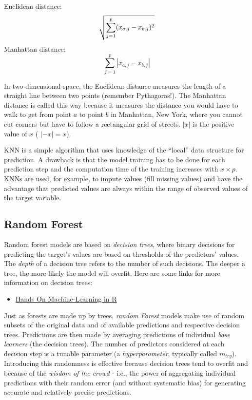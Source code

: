 \documentclass[
]{book}
\providecommand{\tightlist}{%
  \setlength{\itemsep}{0pt}\setlength{\parskip}{0pt}}
\begin{document}
Euclidean distance:
\[
\sqrt{ \sum_{j=1}^p (x_{a,j} - x_{b,j})^2  } \\
\]
Manhattan distance:
\[
\sum_{j=1}^p | x_{a,j} - x_{b,j} |
\]

In two-dimensional space, the Euclidean distance measures the length of a straight line between two points (remember Pythagoras!). The Manhattan distance is called this way because it measures the distance you would have to walk to get from point \(a\) to point \(b\) in Manhattan, New York, where you cannot cut corners but have to follow a rectangular grid of streets. \(|x|\) is the positive value of \(x\) ( \(|-x| = x\)).

KNN is a simple algorithm that uses knowledge of the ``local'' data structure for prediction. A drawback is that the model training has to be done for each prediction step and the computation time of the training increases with \(x \times p\). KNNs are used, for example, to impute values (fill missing values) and have the advantage that predicted values are always within the range of observed values of the target variable.

\hypertarget{random-forest}{%
\subsection{Random Forest}\label{random-forest}}

Random forest models are based on \emph{decision trees}, where binary decisions for predicting the target's values are based on thresholds of the predictors' values. The \emph{depth} of a decision tree refers to the number of such decisions. The deeper a tree, the more likely the model will overfit. Here are some links for more information on decision trees:

\begin{itemize}
\tightlist
\item
  \href{https://bradleyboehmke.github.io/HOML/DT.html}{Hands On Machine-Learning in R}
\end{itemize}

Just as forests are made up by trees, \emph{random Forest} models make use of random subsets of the original data and of available predictions and respective decision trees. Predictions are then made by averaging predictions of individual \emph{base learners} (the decision trees). The number of predictors considered at each decision step is a tunable parameter (a \emph{hyperparameter}, typically called \(m_{try}\)). Introducing this randomness is effective because decision trees tend to overfit and because of the \emph{wisdom of the crowd} - i.e., the power of aggregating individual predictions with their random error (and without systematic bias) for generating accurate and relatively precise predictions.
\end{document}
